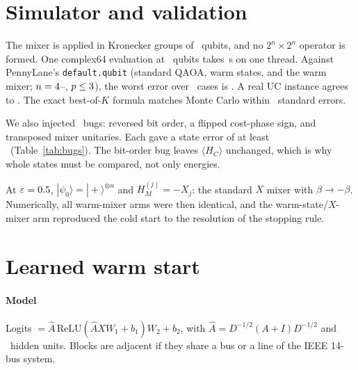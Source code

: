 \documentclass[10pt,conference]{IEEEtran}
\begin{document}
\section{Simulator and validation}

The mixer is applied in Kronecker groups of \MixerGroup\ qubits, and no $2^n\times2^n$ operator is formed. One complex64 evaluation at \NLfour\ qubits takes \SimEvalLfourCsixfour\,s on one thread. Against PennyLane's \texttt{default.qubit} (standard QAOA, warm states, and the warm mixer; $n=4$--\ValNMax, $p\leq3$), the worst error over \ValCases\ cases is \ValWorst. A real UC instance agrees to \ValUCWorst. The exact best-of-$K$ formula matches Monte Carlo within \ValMCMaxZ\ standard errors.

We also injected \ValBugN\ bugs: reversed bit order, a flipped cost-phase sign, and transposed mixer unitaries. Each gave a state error of at least \ValBugMinState\ (Table~\ref{tab:bugs}). The bit-order bug leaves $\langle H_C\rangle$ unchanged, which is why whole states must be compared, not only energies.

At $\varepsilon=0.5$, $|\psi_0\rangle=|+\rangle^{\otimes n}$ and $H_M^{(j)}=-X_j$: the standard $X$ mixer with $\beta\to-\beta$. Numerically, all warm-mixer arms were then identical, and the warm-state/$X$-mixer arm reproduced the cold start to the resolution of the stopping rule.

\begin{table}[t]
\centering
\caption{Injected-bug checks ($n=\ValBugQubits$, $p=\ValBugP$): each deliberately wrong simulator variant compared with the correct PennyLane circuit. State error: maximum amplitude difference after removing the global phase. Energy error: $|\langle H_C\rangle$ difference$|$.}
\label{tab:bugs}
\footnotesize

\end{table}

\section{Learned warm start}

\paragraph{Model} Logits $=\hat A\,\mathrm{ReLU}(\hat AXW_1+b_1)W_2+b_2$, with $\hat A=D^{-1/2}(A+I)D^{-1/2}$ and \GCNHidden\ hidden units. Blocks are adjacent if they share a bus or a line of the IEEE 14-bus system.
\end{document}
